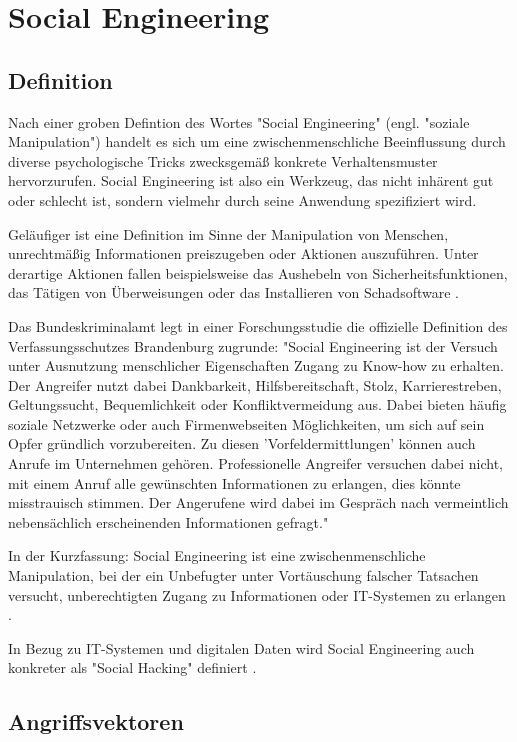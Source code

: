 \chapter{Social Engineering}
\label{chapter:se}

\section{Definition}

Nach einer groben Defintion des Wortes "Social Engineering" (engl. "soziale Manipulation")
handelt es sich um eine zwischenmenschliche Beeinflussung durch diverse psychologische
Tricks zwecksgemäß konkrete Verhaltensmuster hervorzurufen.
Social Engineering ist also ein Werkzeug, das nicht inhärent gut oder schlecht ist, sondern vielmehr durch seine Anwendung spezifiziert wird.


Geläufiger ist eine Definition im Sinne der Manipulation von Menschen, unrechtmäßig Informationen preiszugeben oder Aktionen auszuführen.
Unter derartige Aktionen fallen beispielsweise das Aushebeln von Sicherheitsfunktionen, das Tätigen von Überweisungen oder
das Installieren von Schadsoftware .

Das Bundeskriminalamt legt in einer Forschungsstudie die offizielle Definition des Verfassungsschutzes Brandenburg
zugrunde: "Social Engineering ist der Versuch unter Ausnutzung menschlicher Eigenschaften Zugang zu Know-how zu erhalten.
Der Angreifer nutzt dabei Dankbarkeit, Hilfsbereitschaft, Stolz, Karrierestreben, Geltungssucht, Bequemlichkeit oder Konfliktvermeidung aus.
Dabei bieten häufig soziale Netzwerke oder auch Firmenwebseiten Möglichkeiten, um sich auf sein Opfer gründlich vorzubereiten.
Zu diesen 'Vorfeldermittlungen' können auch Anrufe im Unternehmen gehören.
Professionelle Angreifer versuchen dabei nicht, mit einem Anruf alle gewünschten Informationen zu erlangen,
dies könnte misstrauisch stimmen. Der Angerufene wird dabei im Gespräch nach vermeintlich nebensächlich erscheinenden Informationen gefragt."

In der Kurzfassung: Social Engineering ist eine zwischenmenschliche Manipulation,
bei der ein Unbefugter unter Vortäuschung falscher Tatsachen versucht, unberechtigten Zugang zu Informationen oder IT-Systemen zu erlangen .

In Bezug zu IT-Systemen und digitalen Daten wird Social Engineering auch konkreter als "Social Hacking" definiert .

\section{Angriffsvektoren}


